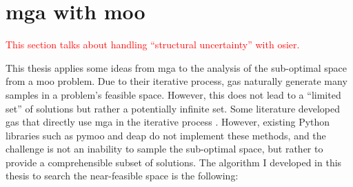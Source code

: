 \section{\acs{mga} with \acl{moo}}
\label{section:mga-moo}

\textcolor{red}{This section talks about handling ``structural uncertainty'' with \ac{osier}.}


This thesis applies some ideas from \ac{mga} to the analysis of the sub-optimal
space from a \acl{moo} problem. Due to their iterative process, \acp{ga}
naturally generate many samples in a problem's feasible space. However, this
does not lead to a ``limited set'' of solutions but rather a potentially
infinite set. Some literature developed \acp{ga} that directly use \ac{mga} in
the iterative process
\cite{zechman_evolutionary_2004,zechman_evolutionary_2013}. However, existing
Python libraries such as \ac{pymoo} and \ac{deap} do not implement these
methods, and the challenge is not an inability to sample the sub-optimal space,
but rather to provide a comprehensible subset of solutions. The algorithm I
developed in this thesis to search the near-feasible space is the following:

